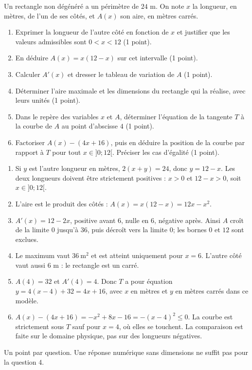 \label{t11s-ds1-e03}\par
Un rectangle non dégénéré a un périmètre de $24$ m. On note $x$ la longueur, en mètres, de l’un de ses côtés, et $A(x)$ son aire, en mètres carrés.
\begin{enumerate}
\item Exprimer la longueur de l’autre côté en fonction de $x$ et justifier que les valeurs admissibles sont $0<x<12$ (1 point).
\item En déduire $A(x)=x(12-x)$ sur cet intervalle (1 point).
\item Calculer $A'(x)$ et dresser le tableau de variation de $A$ (1 point).
\item Déterminer l’aire maximale et les dimensions du rectangle qui la réalise, avec leurs unités (1 point).
\item Dans le repère des variables $x$ et $A$, déterminer l’équation de la tangente $T$ à la courbe de $A$ au point d’abscisse $4$ (1 point).
\item Factoriser $A(x)-(4x+16)$, puis en déduire la position de la courbe par rapport à $T$ pour tout $x\in]0;12[$. Préciser les cas d’égalité (1 point).
\end{enumerate}
\begin{corrige}\label{sol-t11s-ds1-e03}
\begin{enumerate}
\item Si $y$ est l’autre longueur en mètres, $2(x+y)=24$, donc $y=12-x$. Les deux longueurs doivent être strictement positives : $x>0$ et $12-x>0$, soit $x\in]0;12[$.
\item L’aire est le produit des côtés : $A(x)=x(12-x)=12x-x^2$.
\item $A'(x)=12-2x$, positive avant $6$, nulle en $6$, négative après. Ainsi $A$ croît de la limite $0$ jusqu’à $36$, puis décroît vers la limite $0$; les bornes $0$ et $12$ sont exclues.
\item Le maximum vaut $36\ \mathrm{m}^2$ et est atteint uniquement pour $x=6$. L’autre côté vaut aussi $6$ m : le rectangle est un carré.
\item $A(4)=32$ et $A'(4)=4$. Donc $T$ a pour équation $y=4(x-4)+32=4x+16$, avec $x$ en mètres et $y$ en mètres carrés dans ce modèle.
\item $A(x)-(4x+16)=-x^2+8x-16=-(x-4)^2\le0$. La courbe est strictement sous $T$ sauf pour $x=4$, où elles se touchent. La comparaison est faite sur le domaine physique, pas sur des longueurs négatives.
\end{enumerate}
Un point par question. Une réponse numérique sans dimensions ne suffit pas pour la question 4.
\end{corrige}
\endgroup
